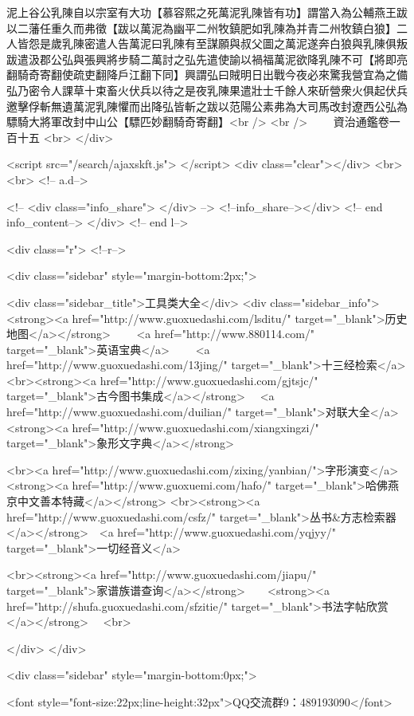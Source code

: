 泥上谷公乳陳自以宗室有大功【慕容熙之死萬泥乳陳皆有功】謂當入為公輔燕王跋以二藩任重久而弗徵【跋以萬泥為幽平二州牧鎮肥如乳陳為并青二州牧鎮白狼】二人皆怨是歲乳陳密遣人告萬泥曰乳陳有至謀願與叔父圖之萬泥遂奔白狼與乳陳俱叛跋遣汲郡公弘與張興將步騎二萬討之弘先遣使諭以禍福萬泥欲降乳陳不可【將即亮翻騎奇寄翻使疏吏翻降戶江翻下同】興謂弘曰賊明日出戰今夜必來驚我營宜為之備弘乃密令人課草十束畜火伏兵以待之是夜乳陳果遣壯士千餘人來斫營衆火俱起伏兵邀擊俘斬無遺萬泥乳陳懼而出降弘皆斬之跋以范陽公素弗為大司馬改封遼西公弘為驃騎大將軍改封中山公【驃匹妙翻騎奇寄翻】<br />
<br />
　　資治通鑑卷一百十五  <br>
   </div> 

<script src="/search/ajaxskft.js"> </script>
 <div class="clear"></div>
<br>
<br>
 <!-- a.d-->

 <!--
<div class="info_share">
</div> 
-->
 <!--info_share--></div>   <!-- end info_content-->
  </div> <!-- end l-->

<div class="r">   <!--r-->



<div class="sidebar"  style="margin-bottom:2px;">

 
<div class="sidebar_title">工具类大全</div>
<div class="sidebar_info">
<strong><a href="http://www.guoxuedashi.com/lsditu/" target="_blank">历史地图</a></strong>　　
<a href="http://www.880114.com/" target="_blank">英语宝典</a>　　
<a href="http://www.guoxuedashi.com/13jing/" target="_blank">十三经检索</a>　
<br><strong><a href="http://www.guoxuedashi.com/gjtsjc/" target="_blank">古今图书集成</a></strong>　
<a href="http://www.guoxuedashi.com/duilian/" target="_blank">对联大全</a>　<strong><a href="http://www.guoxuedashi.com/xiangxingzi/" target="_blank">象形文字典</a></strong>　

<br><a href="http://www.guoxuedashi.com/zixing/yanbian/">字形演变</a>　　<strong><a href="http://www.guoxuemi.com/hafo/" target="_blank">哈佛燕京中文善本特藏</a></strong>
<br><strong><a href="http://www.guoxuedashi.com/csfz/" target="_blank">丛书&方志检索器</a></strong>　<a href="http://www.guoxuedashi.com/yqjyy/" target="_blank">一切经音义</a>　　

<br><strong><a href="http://www.guoxuedashi.com/jiapu/" target="_blank">家谱族谱查询</a></strong>　　<strong><a href="http://shufa.guoxuedashi.com/sfzitie/" target="_blank">书法字帖欣赏</a></strong>　
<br>

</div>
</div>


<div class="sidebar" style="margin-bottom:0px;">

<font style="font-size:22px;line-height:32px">QQ交流群9：489193090</font>



